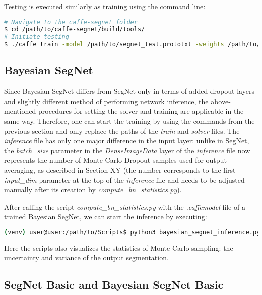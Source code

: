 Testing is executed similarly as training using the command line:

\begin{lstlisting}[language=bash]
# Navigate to the caffe-segnet folder
$ cd /path/to/caffe-segnet/build/tools/
# Initiate testing
$ ./caffe train -model /path/to/segnet_test.prototxt -weights /path/to/final_weights.caffemodel
\end{lstlisting}

\subsection{Bayesian SegNet}

Since Bayesian SegNet differs from SegNet only in terms of added dropout layers and slightly different method of performing network inference, the above-mentioned procedures for setting the solver and training are applicable in the same way. Therefore, one can start the training by using the commands from the previous section and only replace the paths of the \textit{train} and \textit{solver} files. The \textit{inference} file has only one major difference in the input layer: unlike in SegNet, the \textit{batch\_size} parameter in the \textit{DenseImageData} layer of the \textit{inference} file now represents the number of Monte Carlo Dropout samples used for output averaging, as described in Section XY (the number corresponds to the first \textit{input\_dim} parameter at the top of the \textit{inference} file and needs to be adjusted manually after its creation by \textit{compute\_bn\_statistics.py}).

After calling the script \textit{compute\_bn\_statistics.py} with the \textit{.caffemodel} file of a trained Bayesian SegNet, we can start the inference by executing:

\begin{lstlisting}[language=bash]
(venv) user@user:/path/to/Scripts$ python3 bayesian_segnet_inference.py /path/to/inference.prototxt /path/to/final_weights.caffemodel /path/to/videofile.avi 
\end{lstlisting}

Here the scripts also visualizes the statistics of Monte Carlo sampling: the uncertainty and variance of the output segmentation.

\subsection{SegNet Basic and Bayesian SegNet Basic}

